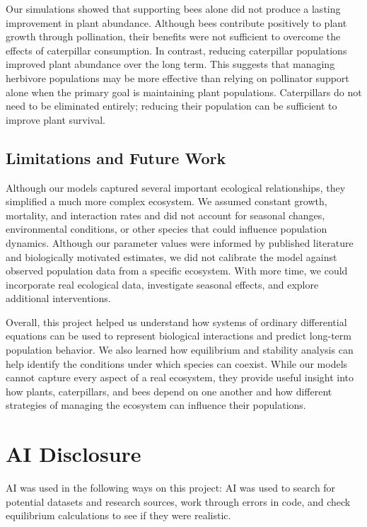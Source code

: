 \documentclass[11pt]{amsart}
\begin{document}
Our simulations showed that supporting bees alone did not produce a lasting improvement in plant abundance. Although bees contribute positively to plant growth through pollination, their benefits were not sufficient to overcome the effects of caterpillar consumption. In contrast, reducing caterpillar populations improved plant abundance over the long term. This suggests that managing herbivore populations may be more effective than relying on pollinator support alone when the primary goal is maintaining plant populations. Caterpillars do not need to be eliminated entirely; reducing their population can be sufficient to improve plant survival.

\subsection{Limitations and Future Work}

Although our models captured several important ecological relationships, they simplified a much more complex ecosystem. We assumed constant growth, mortality, and interaction rates and did not account for seasonal changes, environmental conditions, or other species that could influence population dynamics. Although our parameter values were informed by published literature and biologically motivated estimates, we did not calibrate the model against observed population data from a specific ecosystem. With more time, we could incorporate real ecological data, investigate seasonal effects, and explore additional interventions.

Overall, this project helped us understand how systems of ordinary differential equations can be used to represent biological interactions and predict long-term population behavior. We also learned how equilibrium and stability analysis can help identify the conditions under which species can coexist. While our models cannot capture every aspect of a real ecosystem, they provide useful insight into how plants, caterpillars, and bees depend on one another and how different strategies of managing the ecosystem can influence their populations.

\section{AI Disclosure}

AI was used in the following ways on this project: AI was used to search for potential datasets and research sources, work through errors in code, and check equilibrium calculations to see if they were realistic.
\end{document}
